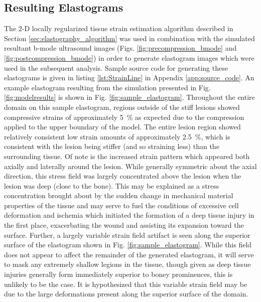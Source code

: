 		\FloatBarrier
		\subsection{Resulting Elastograms}
			\label{sec:elastogram}
			The 2-D locally regularized tissue strain estimation algorithm described in Section \ref{sec:elastography_algorithm} was used in combination with the simulated resultant b-mode ultrasound images (Figs. \ref{fig:precompression_bmode} and \ref{fig:postcompression_bmode}) in order to generate elastogram images which were used in the subsequent analysis. Sample source code for generating these elastograms is given in listing \ref{lst:StrainLine} in Appendix \ref{app:source_code}. An example elastogram resulting from the simulation presented in Fig. \ref{fig:modelresults} is shown in Fig. \ref{fig:sample_elastogram}. Throughout the entire domain on this sample elastogram, regions outside of the stiff lesions showed compressive strains of approximately \SI{5}{\percent} as expected due to the compression applied to the upper boundary of the model. The entire lesion region showed relatively consistent low strain amounts of approximately \SI{2.5}{\percent}, which is consistent with the lesion being stiffer (and so straining less) than the surrounding tissue. Of note is the increased strain pattern which appeared both axially and laterally around the lesion. While generally symmetric about the axial direction, this stress field was largely concentrated above the lesion when the lesion was deep (close to the bone). This may be explained as a stress concentration brought about by the sudden change in mechanical material properties of the tissue and may serve to fuel the conditions of excessive cell deformation and ischemia which initiated the formation of a deep tissue injury in the first place, exacerbating the wound and assisting its expansion toward the surface. Further, a largely variable strain field artifact is seen along the superior surface of the elastogram shown in Fig. \ref{fig:sample_elastogram}. While this field does not appear to affect the remainder of the generated elastogram, it will serve to mask any extremely shallow legions in the tissue, though given as deep tissue injuries generally form immediately superior to boney prominences, this is unlikely to be the case. It is hypothesized that this variable strain field may be due to the large deformations present along the superior surface of the domain.

